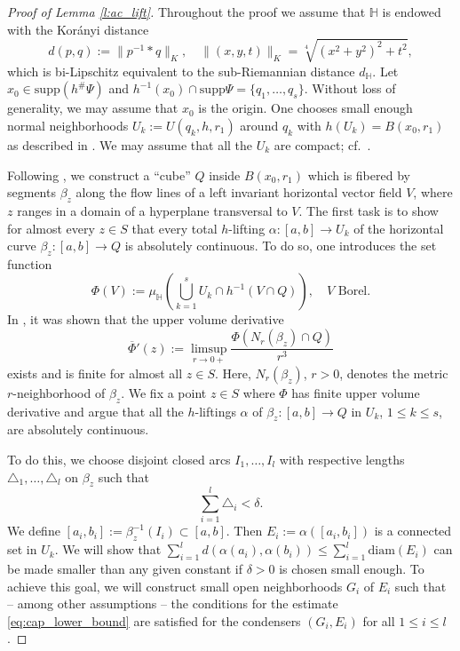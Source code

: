 \documentclass[10pt,letterpaper]{amsart}
\theoremstyle{definition}
\numberwithin{thm}{subsection}
\numberwithin{equation}{section}
\begin{document}
\begin{proof}[Proof of Lemma \ref{l:ac_lift}]
Throughout the proof we assume that $\mathbb{H}$ is endowed with the Kor\'{a}nyi distance
\begin{displaymath}
d(p,q):= \|p^{-1}\ast q\|_K,\quad \|(x,y,t)\|_K=\sqrt[4]{(x^2+y^2)^2 + t^2},
\end{displaymath}
which is bi-Lipschitz equivalent to the sub-Riemannian distance $d_{\mathbb{H}}$.
Let $x_0 \in \mathrm{supp} (h^\#\Psi)$ and $h^{-1}(x_0)\cap \mathrm{supp}\Psi=\{q_1,\ldots,q_s\}$. Without loss of generality, we may assume that $x_0$ is the origin. One chooses small enough normal neighborhoods $U_k:=U(q_k,h,r_1)$ around $q_k$ with $h(U_k)=B(x_0,r_1)$ as described in  \cite{MR2679532}. We may assume that all the $U_k$ are compact; cf.\ \cite[I, Lemma 4.9]{MR2210111}.

Following \cite{MR2679532}, we construct
a ``cube'' $Q$ inside $B(x_0,r_1)$ which is fibered by segments $\beta_z$ along
the flow lines of a left invariant horizontal vector field $V$, where $z$ ranges in a domain of a hyperplane transversal to $V$. The first task is to show for almost every $z\in S$ that every total $h$-lifting
 $\alpha:[a,b]\to U_k$ of the horizontal curve $\beta_z:[a,b] \to Q$  is absolutely continuous. To do so, one introduces the set function
\begin{displaymath}
\Phi(V):= \mu_{\mathbb{H}}\left(\bigcup_{k=1}^s U_k \cap h^{-1}(V\cap Q)\right),\quad V\text{ Borel}.
\end{displaymath}
In \cite[Proposition 1]{MR1375429}, it was shown that the upper volume  derivative
\begin{displaymath}
\overline{\Phi}'(z):= \limsup_{r\to  0+}\frac{\Phi(N_r(\beta_z)\cap Q)}{r^3}
\end{displaymath}
exists and is finite for almost all $z\in S$. Here, $N_r(\beta_z)$, $r>0$, denotes the metric $r$-neighborhood of $\beta_z$. We fix a point $z\in S$ where $\Phi$ has finite upper volume derivative and argue that all the $h$-liftings $\alpha$ of $\beta_z:[a,b]\to Q$ in $U_k$, $1\leq k\leq s$, are absolutely continuous.

To do this, we choose disjoint closed arcs $I_1,\ldots,I_l$ with respective lengths $\triangle_1,\ldots,\triangle_l$ on $\beta_z$ such that
\begin{displaymath}
\sum_{i=1}^l \triangle_i <\delta.
\end{displaymath}
We define $[a_i,b_i]:=\beta_z^{-1}(I_i)\subset [a,b]$. Then $E_i:= \alpha([a_i,b_i])$ is a connected set in $U_k$. We will show that $\sum_{i=1}^l d(\alpha(a_i),\alpha(b_i))\leq \sum_{i=1}^l \mathrm{diam}(E_i)$ can be made smaller than any given constant if $\delta>0$ is chosen small enough. To achieve this goal, we will construct small open neighborhoods $G_i$ of $E_i$ such that -- among other assumptions -- the  conditions for the estimate \eqref{eq:cap_lower_bound} are satisfied for the condensers $(G_i,E_i)$ for all $1\leq i\leq l$.


\end{proof}
\end{document}

